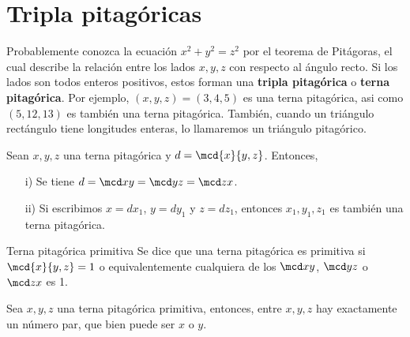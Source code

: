 \section{Tripla pitagóricas}

Probablemente conozca la ecuación $x^2 + y^2 = z^2$ por el teorema de Pitágoras, el cual describe la relación entre los lados $x,y,z$ con respecto al ángulo recto.
Si los lados son todos enteros positivos, estos forman una \textbf{tripla pitagórica} o \textbf{terna pitagórica}.
Por ejemplo, $(x,y,z) = (3,4,5)$ es una terna pitagórica, asi como $(5,12,13)$ es también una terna pitagórica.
También, cuando un triángulo rectángulo tiene longitudes enteras, lo llamaremos un triángulo pitagórico.

\begin{lemma}
    Sean $x,y,z$ una terna pitagórica y $d = \mcd{x}{y,z}$.
    Entonces,
    \begin{enumerate}
        \item [i)] Se tiene $d = \mcd x y = \mcd y z = \mcd z x$.
        \item [ii)] Si escribimos $x = d x_1$, $y = d y_1$ y $z = d z_1$, entonces $x_1, y_1, z_1$ es también una terna pitagórica.
    \end{enumerate}
\end{lemma}

\begin{definition.box}{Terna pitagórica primitiva}{}
    Se dice que una terna pitagórica es primitiva si $\mcd{x}{y,z} = 1$ o equivalentemente cualquiera de los $\mcd x y$, $\mcd y z$ o $\mcd z x$ es 1.
\end{definition.box}

\begin{lemma}
    Sea $x,y,z$ una terna pitagórica primitiva, entonces, entre $x,y,z$ hay exactamente un número par, que bien puede ser $x$ o $y$.
\end{lemma}

